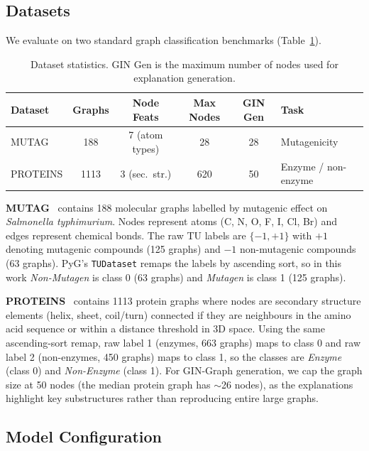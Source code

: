 \documentclass[12pt,a4paper]{article}
\begin{document}
\subsection{Datasets}

We evaluate on two standard graph classification benchmarks (Table~\ref{tab:datasets}).

\begin{table}[htbp]
\centering
\caption{Dataset statistics. GIN Gen is the maximum number of nodes used for explanation generation.}
\label{tab:datasets}
\begin{tabular}{lccccl}
\toprule
\textbf{Dataset} & \textbf{Graphs} & \textbf{Node Feats} & \textbf{Max Nodes} & \textbf{GIN Gen} & \textbf{Task} \\
\midrule
MUTAG    & 188  & 7 (atom types) & 28  & 28 & Mutagenicity \\
PROTEINS & 1113 & 3 (sec.\ str.) & 620 & 50 & Enzyme / non-enzyme \\
\bottomrule
\end{tabular}
\end{table}

\textbf{MUTAG}~\cite{debnath1991structure} contains 188 molecular graphs labelled by mutagenic effect on \textit{Salmonella typhimurium}. Nodes represent atoms (C, N, O, F, I, Cl, Br) and edges represent chemical bonds. The raw TU labels are $\{-1, +1\}$ with $+1$ denoting mutagenic compounds (125 graphs) and $-1$ non-mutagenic compounds (63 graphs). PyG's \texttt{TUDataset} remaps the labels by ascending sort, so in this work \emph{Non-Mutagen} is class 0 (63 graphs) and \emph{Mutagen} is class 1 (125 graphs).

\textbf{PROTEINS}~\cite{borgwardt2005protein} contains 1113 protein graphs where nodes are secondary structure elements (helix, sheet, coil/turn) connected if they are neighbours in the amino acid sequence or within a distance threshold in 3D space. Using the same ascending-sort remap, raw label 1 (enzymes, 663 graphs) maps to class 0 and raw label 2 (non-enzymes, 450 graphs) maps to class 1, so the classes are \emph{Enzyme} (class 0) and \emph{Non-Enzyme} (class 1). For GIN-Graph generation, we cap the graph size at 50 nodes (the median protein graph has $\sim$26 nodes), as the explanations highlight key substructures rather than reproducing entire large graphs.

\subsection{Model Configuration}
\end{document}
